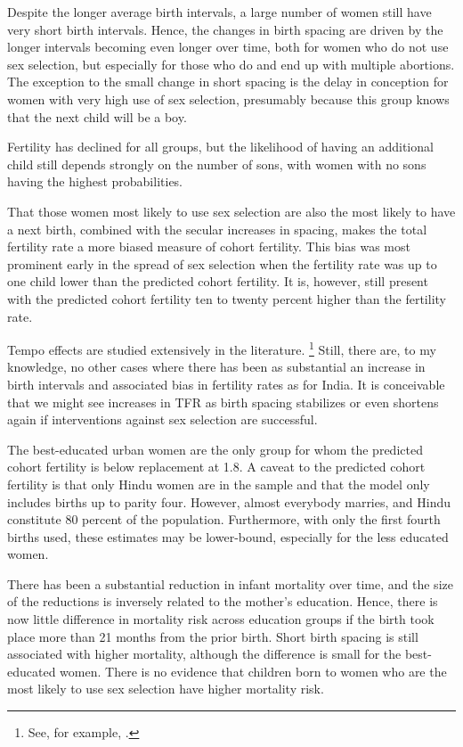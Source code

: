 \documentclass[12pt,letterpaper]{article}
\begin{document}
Despite the longer average birth intervals, a large number of women
still have very short birth intervals. 
Hence, the changes in birth
spacing are driven by the longer intervals becoming even longer over
time, both for women who do not use sex selection, but especially for
those who do and end up with multiple abortions. 
The exception to the
small change in short spacing is the delay in conception for women with
very high use of sex selection, presumably because this group knows that
the next child will be a boy.

Fertility has declined for all groups, but the likelihood of having an additional child
still depends strongly on the number of sons, with women with no sons having the highest 
probabilities.

That those women most likely to use sex selection are also the most
likely to have a next birth, combined with the secular increases in
spacing, makes the total fertility rate a more biased measure of cohort
fertility. 
This bias was most prominent early in the spread of sex
selection when the fertility rate was up to one child lower than the
predicted cohort fertility. 
It is, however, still present with the
predicted cohort fertility ten to twenty percent higher than the
fertility rate.

Tempo effects are studied extensively in the literature.%
\footnote{
See, for example, \citet{Bongaarts1999}.
}
Still, there are, to my knowledge, no other cases where there has been as 
substantial an increase in birth intervals and associated bias in fertility rates 
as for India.
It is conceivable that we might see increases in TFR as birth spacing 
stabilizes or even shortens again if interventions against sex selection are successful.

The best-educated urban women are the only group for whom the predicted cohort fertility 
is below replacement at 1.8. 
A caveat to the predicted cohort fertility is that only Hindu women are
in the sample and that the model only includes births up to parity four.
However, almost everybody marries, and Hindu constitute 80 percent of the population.
Furthermore, with only the first fourth births used, these estimates may
be lower-bound, especially for the less educated women.

There has been a substantial reduction in infant mortality over time, and 
the size of the reductions is inversely related to the mother's education.
Hence, there is now little difference in mortality risk across
education groups if the birth took place more than 21 months from the prior birth.
Short birth spacing is still associated with higher mortality, although the difference is 
small for the best-educated women.
There is no evidence that children born to women who are the most likely to use sex 
selection have higher mortality risk. 
\end{document}
